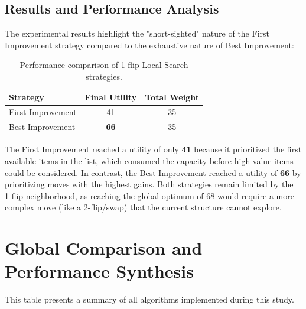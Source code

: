 \documentclass[11pt,a4paper]{article}
\begin{document}
\subsection{Results and Performance Analysis}

The experimental results highlight the "short-sighted" nature of the First Improvement strategy compared to the exhaustive nature of Best Improvement:

\begin{table}[htbp]
    \centering
    \begin{tabular}{|l|c|c|}
        \hline
        \textbf{Strategy} & \textbf{Final Utility} & \textbf{Total Weight} \\
        \hline
        First Improvement & 41 & 35 \\
        Best Improvement & \textbf{66} & 35 \\
        \hline
    \end{tabular}
    \caption{Performance comparison of 1-flip Local Search strategies.}
\end{table}

The First Improvement reached a utility of only \textbf{41} because it prioritized the first available items in the list, which consumed the capacity before high-value items could be considered. In contrast, the Best Improvement reached a utility of \textbf{66} by prioritizing moves with the highest gains. Both strategies remain limited by the 1-flip neighborhood, as reaching the global optimum of 68 would require a more complex move (like a 2-flip/swap) that the current structure cannot explore.


\section{Global Comparison and Performance Synthesis}

This table presents a summary of all algorithms implemented during this study. 
\end{document}
